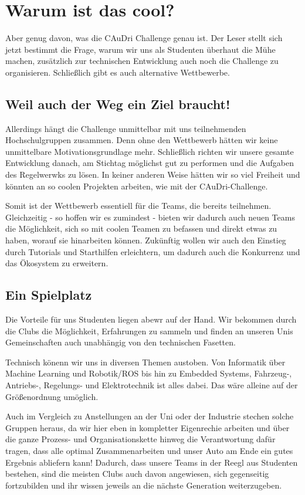 \section{Warum ist das cool?}
Aber genug davon, was die CAuDri Challenge genau ist. 
Der Leser stellt sich jetzt bestimmt die Frage, warum wir uns als Studenten überhaut die Mühe machen, zusätzlich zur technischen Entwicklung auch noch die Challenge zu organisieren.
Schließlich gibt es auch alternative Wettbewerbe.

\subsection{Weil auch der Weg ein Ziel braucht!}
Allerdings hängt die Challenge unmittelbar mit uns teilnehmenden 
Hochschulgruppen zusammen.
Denn ohne den Wettbewerb hätten wir keine unmittelbare Motivationsgrundlage mehr.
Schließlich richten wir unsere gesamte Entwicklung danach, am Stichtag 
möglichst gut zu performen und die Aufgaben des Regelwerwks zu lösen.
In keiner anderen Weise hätten wir so viel Freiheit und könnten an so coolen Projekten 
arbeiten, wie mit der CAuDri-Challenge.

Somit ist der Wettbewerb essentiell für die Teams, die bereits teilnehmen.
Gleichzeitig - so hoffen wir es zumindest - bieten wir dadurch auch neuen Teams
die Möglichkeit, sich so mit coolen Teamen zu befassen und direkt etwas zu haben,
worauf sie hinarbeiten können. Zukünftig wollen wir auch den Einstieg durch Tutorials
und Starthilfen erleichtern, um dadurch auch die Konkurrenz und das Ökosystem zu erweitern.


\subsection{Ein Spielplatz}
Die Vorteile für uns Studenten liegen abewr auf der Hand. Wir bekommen durch 
die Clubs die Möglichkeit, Erfahrungen zu sammeln und finden an unseren Unis Gemeinschaften
auch unabhängig von den technischen Fasetten. 

Technisch könenn wir uns in diversen Themen austoben.
Von Informatik über Machine Learning und Robotik/ROS bis hin zu
Embedded Systems, Fahrzeug-, Antriebs-, Regelungs- und Elektrotechnik
ist alles dabei. Das wäre alleine auf der Größenordnung umöglich.

Auch im Vergleich zu Anstellungen an der Uni oder der Industrie stechen solche
Gruppen heraus, da wir hier eben in kompletter Eigenrechie arbeiten und über
die ganze Prozess- und Organisationskette hinweg die Verantwortung dafür tragen, 
dass alle optimal Zusammenarbeiten und unser Auto am Ende ein gutes Ergebnis abliefern kann!
Dadurch, dass unsere Teams in der Reegl aus Studenten bestehen, sind die meisten Clubs
auch davon angewiesen, sich gegenseitig fortzubilden und ihr wissen jeweils 
an die nächste Generation weiterzugeben. 

